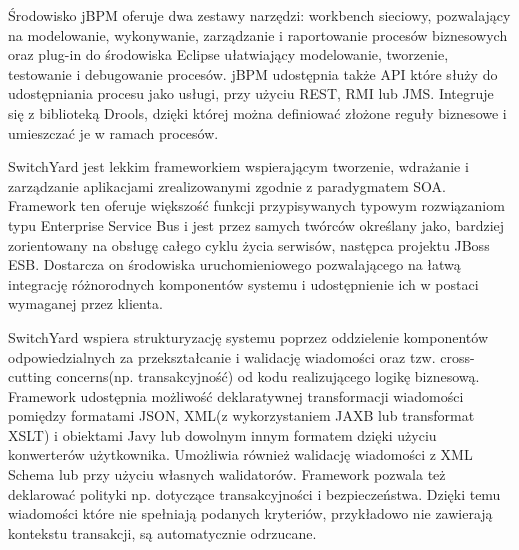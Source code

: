 Środowisko jBPM oferuje dwa zestawy narzędzi: workbench sieciowy, pozwalający na modelowanie, wykonywanie, zarządzanie i raportowanie procesów biznesowych oraz plug-in do środowiska Eclipse ułatwiający modelowanie, tworzenie, testowanie i debugowanie procesów.
jBPM udostępnia także API które służy do udostępniania procesu jako usługi, przy użyciu REST, RMI lub JMS. Integruje się z biblioteką Drools, dzięki której można definiować złożone reguły biznesowe i umieszczać je w ramach procesów.



\label{sec:switchyard}

SwitchYard jest lekkim frameworkiem wspierającym tworzenie, wdrażanie i zarządzanie aplikacjami zrealizowanymi zgodnie z paradygmatem SOA\cite{SwitchYard14}. Framework ten oferuje większość funkcji przypisywanych typowym rozwiązaniom typu Enterprise Service Bus i jest przez samych twórców określany jako, bardziej zorientowany na obsługę całego cyklu życia serwisów, następca projektu JBoss ESB. Dostarcza on środowiska uruchomieniowego pozwalającego na łatwą integrację różnorodnych komponentów systemu i udostępnienie ich w postaci wymaganej przez klienta.

SwitchYard wspiera strukturyzację systemu poprzez oddzielenie komponentów odpowiedzialnych za  przekształcanie i walidację wiadomości oraz tzw. cross-cutting concerns(np. transakcyjność) od kodu realizującego logikę biznesową. Framework udostępnia możliwość deklaratywnej transformacji wiadomości pomiędzy formatami JSON, XML(z wykorzystaniem JAXB lub transformat XSLT) i obiektami Javy lub dowolnym innym formatem dzięki użyciu konwerterów użytkownika. Umożliwia również walidację wiadomości z XML Schema lub przy użyciu własnych walidatorów. Framework pozwala też deklarować polityki np. dotyczące transakcyjności i bezpieczeństwa. Dzięki temu wiadomości które nie spełniają podanych kryteriów, przykładowo nie zawierają kontekstu transakcji, są automatycznie odrzucane. 

